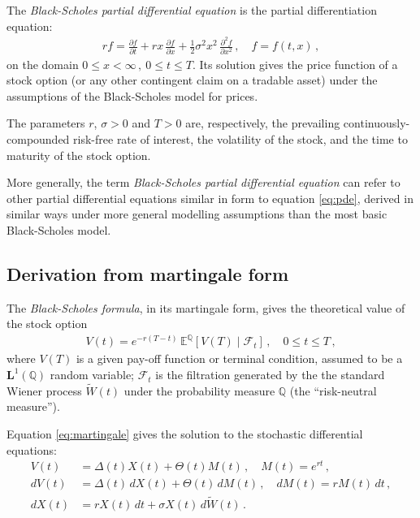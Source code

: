 \documentclass[12pt]{article}
\providecommand{\defnterm}[1]{\emph{#1}}
\providecommand{\pd}[2]{\frac{\partial #1}{\partial #2}}
\providecommand{\pdd}[2]{\frac{\partial^2 #1}{\partial #2}}
\newcommand{\sF}{\mathcal{F}}
\newcommand{\Le}{\mathbf{L}}
\newcommand{\EQ}{\mathbb{E}^\mathbb{Q}}
\newcommand{\PQ}{\mathbb{Q}}
\begin{document}

\tableofcontents

\medskip

The \defnterm{Black-Scholes partial differential equation}
is the partial differentiation equation:
\begin{align}\label{eq:pde}
rf = \pd{f}{t} + rx \, \pd{f}{x} + \frac12 \sigma^2 x^2 \, \pdd{f}{x^2}\,,
\quad f = f(t,x)\,, 
\end{align}
on the domain $0 \leq x < \infty\,, \: 0 \leq t \leq T$.
Its solution gives the price function
of a stock option (or any other contingent claim on a tradable asset)
under the assumptions of the Black-Scholes model for prices.

The parameters $r$, $\sigma > 0$ and $T > 0$
are, respectively, the prevailing continuously-compounded risk-free
rate of interest, the volatility of the stock,
and the time to maturity of the stock option.

More generally, the term \defnterm{Black-Scholes partial differential equation}
can refer to other partial differential equations
similar in form to equation \eqref{eq:pde}, derived 
in similar ways under more
general modelling assumptions than the most basic Black-Scholes model.


\subsection{Derivation from martingale form}

The \emph{Black-Scholes formula}, in its martingale form,
gives the theoretical value of the stock option
\begin{align}\label{eq:martingale}
V(t) = e^{-r(T-t)} \, \EQ[V(T) \mid \sF_t]\,, \quad 0 \leq t \leq T\,,
\end{align}
where $V(T)$ is a given pay-off function
or terminal condition, assumed to be a $\Le^1(\PQ)$ random variable;
$\sF_t$ is the filtration generated by the the standard Wiener
process $\widetilde{W}(t)$
under the probability measure $\PQ$ (the ``risk-neutral measure'').

Equation \eqref{eq:martingale} 
gives the solution to the stochastic differential equations:
\begin{align}
V(t) &= \Delta(t) X(t) + \Theta(t) M(t)\,, \quad M(t) = e^{rt}\,, 
\label{eq:port}
\\
dV(t) &= \Delta(t) \, dX(t) + \Theta(t) \, dM(t)\,, \quad dM(t) = r M(t) \, dt\,, 
\label{eq:port-sde}
\\
dX(t) &= r X(t) \, dt + \sigma X(t) \, d\widetilde{W}(t)
\,. \label{eq:stock-sde}
\end{align}
\end{document}
